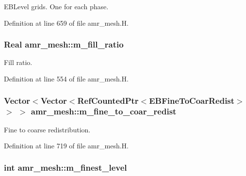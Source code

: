 E\+B\+Level grids. One for each phase. 



Definition at line 659 of file amr\+\_\+mesh.\+H.

\subsubsection[{\texorpdfstring{m\+\_\+fill\+\_\+ratio}{m_fill_ratio}}]{\setlength{\rightskip}{0pt plus 5cm}Real amr\+\_\+mesh\+::m\+\_\+fill\+\_\+ratio\hspace{0.3cm}{\ttfamily [protected]}}\hypertarget{classamr__mesh_a4bdad13eb36fb4c38fbdff019c729664}{}\label{classamr__mesh_a4bdad13eb36fb4c38fbdff019c729664}


Fill ratio. 



Definition at line 554 of file amr\+\_\+mesh.\+H.

\subsubsection[{\texorpdfstring{m\+\_\+fine\+\_\+to\+\_\+coar\+\_\+redist}{m_fine_to_coar_redist}}]{\setlength{\rightskip}{0pt plus 5cm}Vector$<$Vector$<$Ref\+Counted\+Ptr$<$E\+B\+Fine\+To\+Coar\+Redist$>$ $>$ $>$ amr\+\_\+mesh\+::m\+\_\+fine\+\_\+to\+\_\+coar\+\_\+redist\hspace{0.3cm}{\ttfamily [protected]}}\hypertarget{classamr__mesh_a5849a56a0af6335296c0c4e32a3006d5}{}\label{classamr__mesh_a5849a56a0af6335296c0c4e32a3006d5}


Fine to coarse redistribution. 



Definition at line 719 of file amr\+\_\+mesh.\+H.

\subsubsection[{\texorpdfstring{m\+\_\+finest\+\_\+level}{m_finest_level}}]{\setlength{\rightskip}{0pt plus 5cm}int amr\+\_\+mesh\+::m\+\_\+finest\+\_\+level\hspace{0.3cm}{\ttfamily [protected]}}\hypertarget{classamr__mesh_ab03dc79ee887c22a2c15a5e1ae1ed88c}{}\label{classamr__mesh_ab03dc79ee887c22a2c15a5e1ae1ed88c}


